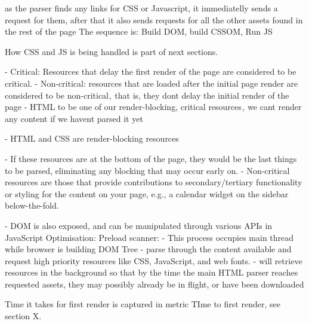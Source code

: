 as the parser finds any links for CSS or Javascript, it immediatelly sends a request for them, after that it also sends requests for all the other assets found in the rest of the page
The sequence is: Build DOM, build CSSOM, Run JS

How CSS and JS is being handled is part of next sections.

- Critical: Resources that delay the first render of the page are considered to be critical.
- Non-critical: resources that are loaded after the initial page render are considered to be non-critical ,  that is, they dont delay the initial render of the page
- HTML to be one of our render-blocking, critical resources ,  we cant render any content if we havent parsed it yet


- HTML and CSS are render-blocking resources


- If these resources are at the bottom of the page, they would be the last things to be parsed, eliminating any blocking that may occur early on.
- Non-critical resources are those that provide contributions to secondary/tertiary functionality or styling for the content on your page, e.g., a calendar widget on the sidebar below-the-fold.






- DOM is also exposed, and can be manipulated through various APIs in JavaScript
Optimisation: Preload scanner:
- This process occupies main thread while browser is building DOM Tree
- parse through the content available and request high priority resources like CSS, JavaScript, and web fonts.
- will retrieve resources in the background so that by the time the main HTML parser reaches requested assets, they may possibly already be in flight, or have been downloaded


Time it takes for first render is captured in metric TIme to first render, see section X.






